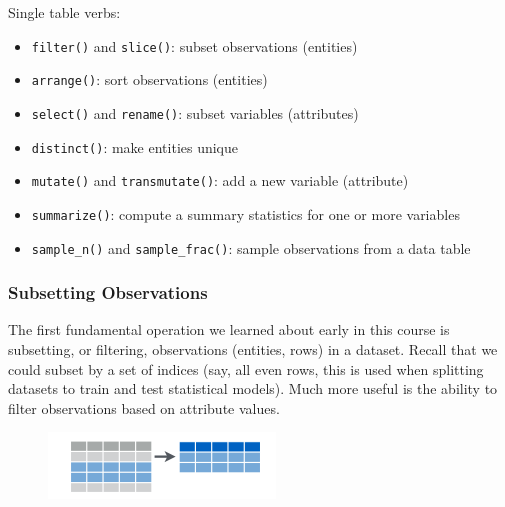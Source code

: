 \documentclass[]{article}
\newenvironment{Shaded}{\begin{snugshade}}{\end{snugshade}}
\newcommand{\KeywordTok}[1]{\textcolor[rgb]{0.13,0.29,0.53}{\textbf{{#1}}}}
\newcommand{\DataTypeTok}[1]{\textcolor[rgb]{0.13,0.29,0.53}{{#1}}}
\newcommand{\DecValTok}[1]{\textcolor[rgb]{0.00,0.00,0.81}{{#1}}}
\newcommand{\StringTok}[1]{\textcolor[rgb]{0.31,0.60,0.02}{{#1}}}
\newcommand{\CommentTok}[1]{\textcolor[rgb]{0.56,0.35,0.01}{\textit{{#1}}}}
\newcommand{\NormalTok}[1]{{#1}}
\theoremstyle{definition}
\theoremstyle{definition}
\theoremstyle{remark}
\begin{document}
Single table verbs:

\begin{itemize}
\itemsep1pt\parskip0pt
\item
  \texttt{filter()} and \texttt{slice()}: subset observations
  (entities)\\
\item
  \texttt{arrange()}: sort observations (entities)\\
\item
  \texttt{select()} and \texttt{rename()}: subset variables
  (attributes)\\
\item
  \texttt{distinct()}: make entities unique\\
\item
  \texttt{mutate()} and \texttt{transmutate()}: add a new variable
  (attribute)\\
\item
  \texttt{summarize()}: compute a summary statistics for one or more
  variables\\
\item
  \texttt{sample\_n()} and \texttt{sample\_frac()}: sample observations
  from a data table
\end{itemize}

\subsubsection{Subsetting Observations}\label{subsetting-observations}

The first fundamental operation we learned about early in this course is
subsetting, or filtering, observations (entities, rows) in a dataset.
Recall that we could subset by a set of indices (say, all even rows,
this is used when splitting datasets to train and test statistical
models). Much more useful is the ability to filter observations based on
attribute values.

\begin{figure}[htbp]
\centering
\includegraphics{img/subset.png}
\caption{}
\end{figure}

\begin{Shaded}
\end{Shaded}
\end{document}
